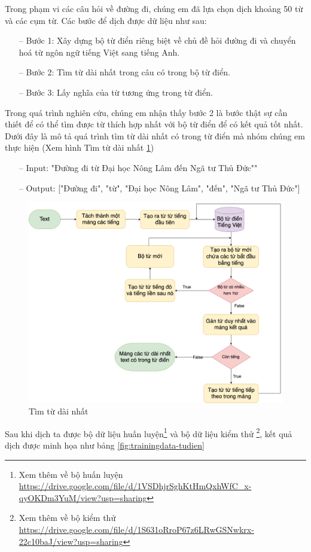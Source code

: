 Trong phạm vi các câu hỏi về đường đi, chúng em đã lựa chọn dịch khoảng 50 từ và các cụm từ. Các bước để dịch được dữ liệu như sau:
\begin{itemize}
    \item[--] Bước 1: Xây dựng bộ từ điển riêng biệt về chủ đề hỏi đường đi và chuyển hoá từ ngôn ngữ tiếng Việt sang tiếng Anh.
    \item[--] Bước 2: Tìm từ dài nhất trong câu có trong bộ từ điển.
    \item[--] Bước 3: Lấy nghĩa của từ tương ứng trong từ điển.
\end{itemize}
Trong quá trình nghiên cứu, chúng em nhận thấy bước 2 là bước thật sự cần thiết để có thể tìm được từ thích hợp nhất với bộ từ điển để có kết quả tốt nhất. Dưới đây là mô tả quá trình tìm từ dài nhất có trong từ điển mà nhóm chúng em thực hiện (Xem hình Tìm từ dài nhất \ref{fig:longest-word})
\begin{itemize}
    \item[--] Input: "Đường đi từ Đại học Nông Lâm đến Ngã tư Thủ Đức""
    \item[--] Output: ["Đường đi", "từ", "Đại học Nông Lâm", "đến", "Ngã tư Thủ Đức"]
\end{itemize}
\begin{figure}[htp]
    \centering
    \includegraphics[width=15cm]{images/Diagram-longest-word.png}
    \caption{Tìm từ dài nhất}
    \label{fig:longest-word}
\end{figure}

Sau khi dịch ta được bộ dữ liệu huấn luyện\footnote{Xem thêm về bộ huấn luyện \url{https://drive.google.com/file/d/1VSDhjrSghKtHmQxhWfC_x-qyOKDm3YuM/view?usp=sharing}} và bộ dữ liệu kiểm thử \footnote{Xem thêm về bộ kiểm thử \url{https://drive.google.com/file/d/1S631oRroP67z6LRwGSNwkrx-22c10baJ/view?usp=sharing}}, kết quả dịch được minh họa như bảng \ref{fig:trainingdata-tudien}

